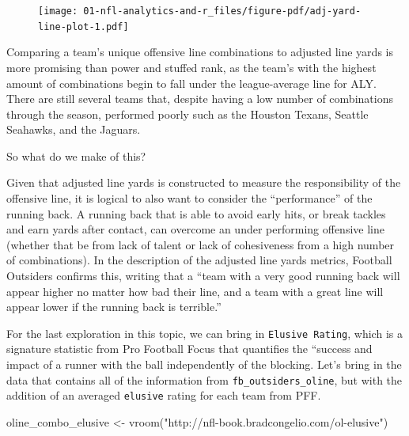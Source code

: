 \documentclass[
  letterpaper,
]{krantz}
\newenvironment{Shaded}{\begin{snugshade}}{\end{snugshade}}
\newcommand{\FunctionTok}[1]{\textcolor[rgb]{0.28,0.35,0.67}{#1}}
\newcommand{\NormalTok}[1]{\textcolor[rgb]{0.00,0.23,0.31}{#1}}
\newcommand{\OtherTok}[1]{\textcolor[rgb]{0.00,0.23,0.31}{#1}}
\newcommand{\StringTok}[1]{\textcolor[rgb]{0.13,0.47,0.30}{#1}}
\begin{document}
\begin{figure}[H]

{\centering \texttt{[image: 01-nfl-analytics-and-r\_files/figure-pdf/adj-yard-line-plot-1.pdf]}

}

\end{figure}

Comparing a team's unique offensive line combinations to adjusted line
yards is more promising than power and stuffed rank, as the team's with
the highest amount of combinations begin to fall under the
league-average line for ALY. There are still several teams that, despite
having a low number of combinations through the season, performed poorly
such as the Houston Texans, Seattle Seahawks, and the Jaguars.

So what do we make of this?

Given that adjusted line yards is constructed to measure the
responsibility of the offensive line, it is logical to also want to
consider the ``performance'' of the running back. A running back that is
able to avoid early hits, or break tackles and earn yards after contact,
can overcome an under performing offensive line (whether that be from
lack of talent or lack of cohesiveness from a high number of
combinations). In the description of the adjusted line yards metrics,
Football Outsiders confirms this, writing that a ``team with a very good
running back will appear higher no matter how bad their line, and a team
with a great line will appear lower if the running back is terrible.''

For the last exploration in this topic, we can bring in
\texttt{Elusive\ Rating}, which is a signature statistic from Pro
Football Focus that quantifies the ``success and impact of a runner with
the ball independently of the blocking. Let's bring in the data that
contains all of the information from \texttt{fb\_outsiders\_oline}, but
with the addition of an averaged \texttt{elusive} rating for each team
from PFF.

\begin{Shaded}
\begin{Highlighting}[]
\NormalTok{oline\_combo\_elusive }\OtherTok{\textless{}{-}} \FunctionTok{vroom}\NormalTok{(}\StringTok{"http://nfl{-}book.bradcongelio.com/ol{-}elusive"}\NormalTok{)}
\end{Highlighting}
\end{Shaded}
\end{document}
